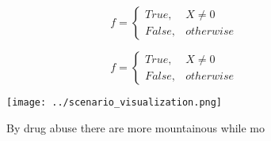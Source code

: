 \documentclass[a4paper]{article}
\begin{document}
\begin{equation}   f =
\begin{cases} True, & X \neq 0\\
False, & otherwise
\end{cases}
\end{equation}

\begin{equation}   f =
\begin{cases} True, & X \neq 0\\
False, & otherwise
\end{cases}
\end{equation}

\begin{figure}
\centering
\texttt{[image: ../scenario\_visualization.png]}
\caption{By drug abuse there are more mountainous while mo
}
\end{figure}
 
\end{document}
